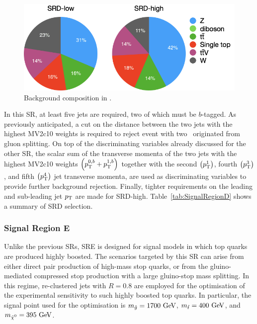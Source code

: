 				\begin{figure}[t]
				  \begin{center}
				   \includegraphics[width=.7\textwidth]{figures/stop/piechart_SRDcomp}
				   \caption{Background composition in \SRD.}
				   \label{fig:SRD_bkgcomp}
				  \end{center}
				\end{figure}

				In this \ac{SR}, at least five jets are required, two of which must be $b$-tagged. As previously anticipated, a cut on the distance between the two jets with the highest MV2c10 weights is required to reject event with two \bjs\ originated from gluon splitting. On top of the discriminating variables already discussed for the other \ac{SR}, the scalar sum of the transverse momenta of the two jets with the highest MV2c10 weights $\left(p_{\mathrm{T}}^{0,b}+p_{\mathrm{T}}^{1,b}\right)$ together with the second $\left(p_{\mathrm{T}}^{1}\right)$, fourth $\left(p_{\mathrm{T}}^{3}\right)$, and fifth $\left(p_{\mathrm{T}}^{4}\right)$ jet transverse momenta, are used as discriminating variables to provide further background rejection. Finally, tighter requirements on the leading and sub-leading jet $p_{\mathrm{T}}$ are made for SRD-high. Table~\ref{tab:SignalRegionD} shows a summary of SRD selection.






			\subsubsection*{Signal Region E}


				Unlike the previous \acp{SR}, SRE is designed for signal models in which top quarks are produced highly boosted. The scenarios targeted by this \ac{SR} can arise from either direct pair production of high-mass stop quarks, or from the gluino-mediated compressed stop production with a large gluino-stop mass splitting. In this regime, re-clustered jets with $R=0.8$ are employed for the optimisation of the experimental sensitivity to such highly boosted top quarks. In particular, the signal point used for the optimisation is $m_{\gluino} = 1700 \GeV$, $\mstop=400\GeV$, and $\mLSP=395\GeV$.

